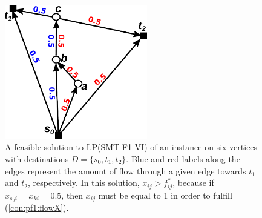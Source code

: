 \begin{figure}[h!]
        \centering
        \includegraphics[height=2.3in]{counterex}
        \caption{A feasible solution to LP(SMT-F1-VI) of an instance on six vertices with destinations $D=\{s_0,t_1,t_2\}$.
		 Blue and red labels along the edges represent the amount of flow through a given edge towards $t_1$ and $t_2$, respectively.
		 In this solution, $x_{ij}>f^*_{ij}$, because if $x_{s_0i}=x_{ki}=0.
		5$, then $x_{ij}$ must be equal to 1 in order to fulfill (\ref{con:pf1:flowX}).}
        \label{fig:counterex}
\end{figure}
 
